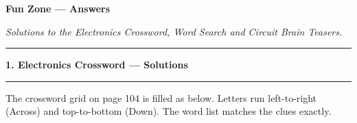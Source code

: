 \thispagestyle{empty}
\begin{center}
  {\LARGE\bfseries\rmfamily\color{IEEEblue} Fun Zone — Answers\par}
  \vspace{0.1em}
  {\small\itshape Solutions to the Electronics Crossword, Word Search and Circuit Brain Teasers.\par}
  \vspace{0.25em}
  {\color{IEEEorange}\rule{0.92\textwidth}{1pt}}\par
\end{center}

\vspace{0.3em}

\begin{tcolorbox}[
  colback=SoftBlue,
  colframe=IEEEblue!70!black,
  boxrule=0.5pt,
  arc=0mm,
  left=4mm, right=4mm, top=1.5mm, bottom=1.5mm
]
{\large\bfseries\rmfamily\color{IEEEblue} 1. Electronics Crossword — Solutions\par}
\vspace{0.15em}
{\color{IEEEorange}\rule{\linewidth}{0.8pt}}\par
\smallskip
\footnotesize\rmfamily
\noindent The crossword grid on page 104 is filled as below. Letters run left-to-right (Across) and top-to-bottom (Down). The word list matches the clues exactly.


\end{tcolorbox}
